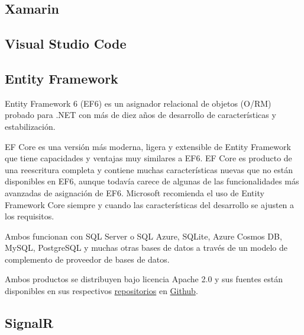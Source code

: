 \subsection{Xamarin}


\subsection{Visual Studio Code}


\subsection{Entity Framework}
Entity Framework 6 (EF6) es un asignador relacional de objetos (O/RM) probado para .NET con más de diez años de desarrollo de características y estabilización.

EF Core es una versión más moderna, ligera y extensible de Entity Framework que tiene capacidades y ventajas muy similares a EF6. EF Core es producto de una reescritura completa y contiene muchas características nuevas que no están disponibles en EF6, aunque todavía carece de algunas de las funcionalidades más avanzadas de asignación de EF6. Microsoft recomienda el uso de Entity Framework Core siempre y cuando las características del desarrollo se ajusten a los requisitos.

Ambos funcionan con SQL Server o SQL Azure, SQLite, Azure Cosmos DB, MySQL, PostgreSQL y muchas otras bases de datos a través de un modelo de complemento de proveedor de bases de datos.

Ambos productos se distribuyen bajo licencia Apache 2.0 y sus fuentes están disponibles en sus respectivos \href{https://github.com/dotnet/ef6}{repositorios} en \href{https://github.com/dotnet/efcore}{Github}.

\subsection{SignalR}